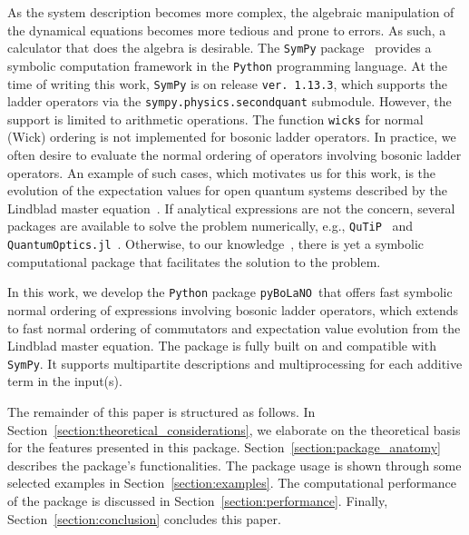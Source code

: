 \documentclass[5p, twocolumn, 10pt, sort&compress]{elsarticle}
\newcounter{bla}
\newcommand{\inlinecode}[1]{\texttt{#1}}
\newcommand{\pybolano}{\texttt{pyBoLaNO}~}
\begin{document}
As the system description becomes more complex, the algebraic manipulation of the dynamical equations becomes more tedious and prone to errors. As such, a calculator that does the algebra is desirable. The \texttt{SymPy} package~\cite{meurer_sympy_2017} provides a symbolic computation framework in the \texttt{Python} programming language. At the time of writing this work, \texttt{SymPy} is on release \inlinecode{ver. 1.13.3}, which supports the ladder operators via the \inlinecode{sympy.physics.secondquant} submodule. However, the support is limited to arithmetic operations. The function \inlinecode{wicks} for normal (Wick) ordering is not implemented for bosonic ladder operators. In practice, we often desire to evaluate the normal ordering of operators involving bosonic ladder operators. An example of such cases, which motivates us for this work, is the evolution of the expectation values for open quantum systems described by the Lindblad master equation~\cite{schlosshauer_decoherence_2007, breuer_theory_2002}. If analytical expressions are not the concern, several packages are available to solve the problem numerically, e.g., \texttt{QuTiP}~\cite{johansson_qutip_2012, johansson_qutip_2013} and \texttt{QuantumOptics.jl}~\cite{Kramer2018}. Otherwise, to our knowledge~\cite{chia_relaxation_2020, Shen2023, downing_hyperbolic_2024, Krimer2019, Zens2019, Ahmadi2024, Downing2021, Downing2022, Downing2023, BenArosh2021, Amitai2018.PhysRevE.97.052203, Minganti2019, Chimczak2023, Farina2019, Zhang2021}, there is yet a symbolic computational package that facilitates the solution to the problem.

In this work, we develop the \texttt{Python} package \pybolano that offers fast symbolic normal ordering of expressions involving bosonic ladder operators, which extends to fast normal ordering of commutators and expectation value evolution from the Lindblad master equation.  The package is fully built on and compatible with \texttt{SymPy}. It supports multipartite descriptions and multiprocessing for each additive term in the input(s).  

The remainder of this paper is structured as follows. In Section~\ref{section:theoretical_considerations}, we elaborate on the theoretical basis for the features presented in this package. Section~\ref{section:package_anatomy} describes the package's functionalities. The package usage is shown through some selected examples in Section~\ref{section:examples}. The computational performance of the package is discussed in Section~\ref{section:performance}. Finally, Section~\ref{section:conclusion} concludes this paper.
\end{document}
